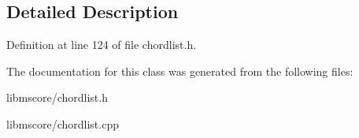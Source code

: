 \subsection{Detailed Description}


Definition at line 124 of file chordlist.\+h.



The documentation for this class was generated from the following files\+:\begin{DoxyCompactItemize}
\item 
libmscore/chordlist.\+h\item 
libmscore/chordlist.\+cpp\end{DoxyCompactItemize}
